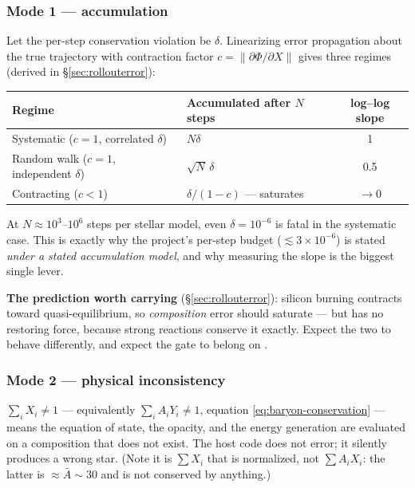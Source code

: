\subsubsection{Mode 1 --- accumulation}
\label{sec:accumulation}

Let the per-step conservation violation be $\delta$. Linearizing error
propagation about the true trajectory with contraction factor
$c = \|\partial\Phi/\partial X\|$ gives three regimes (derived in
\S\ref{sec:rollouterror}):

\begin{center}
\begin{tabular}{@{}l l c@{}}
\toprule
\textbf{Regime} & \textbf{Accumulated after $N$ steps} &
\textbf{log--log slope} \\
\midrule
Systematic ($c = 1$, correlated $\delta$)   & $N\delta$ & 1 \\
Random walk ($c = 1$, independent $\delta$) & $\sqrt{N}\,\delta$ & 0.5 \\
Contracting ($c < 1$) & $\delta/(1-c)$ --- saturates & $\to 0$ \\
\bottomrule
\end{tabular}
\end{center}

At $N \approx 10^{3}$--$10^{6}$ steps per stellar model, even
$\delta = 10^{-6}$ is fatal in the systematic case. This is exactly why the
project's per-step \Ye{} budget ($\lesssim 3\times10^{-6}$) is stated \emph{under
a stated accumulation model}, and why measuring the slope is the biggest single
lever.

\textbf{The prediction worth carrying} (\S\ref{sec:rollouterror}): silicon
burning contracts toward quasi-equilibrium, so \emph{composition} error should
saturate --- but \Ye{} has no restoring force, because strong reactions conserve
it exactly. Expect the two to behave differently, and expect the gate to belong
on \Ye{}.

\subsubsection{Mode 2 --- physical inconsistency}
\label{sec:physicalinconsistency}

$\sum_i X_i \neq 1$ --- equivalently $\sum_i A_i Y_i \neq 1$, equation
\eqref{eq:baryon-conservation} --- means the equation of state, the opacity, and
the energy generation are evaluated on a composition that does not exist. The
host code does not error; it silently produces a wrong star. (Note it is
$\sum X_i$ that is normalized, not $\sum A_iX_i$: the latter is
$\approx \bar{A} \sim 30$ and is not conserved by anything.)

